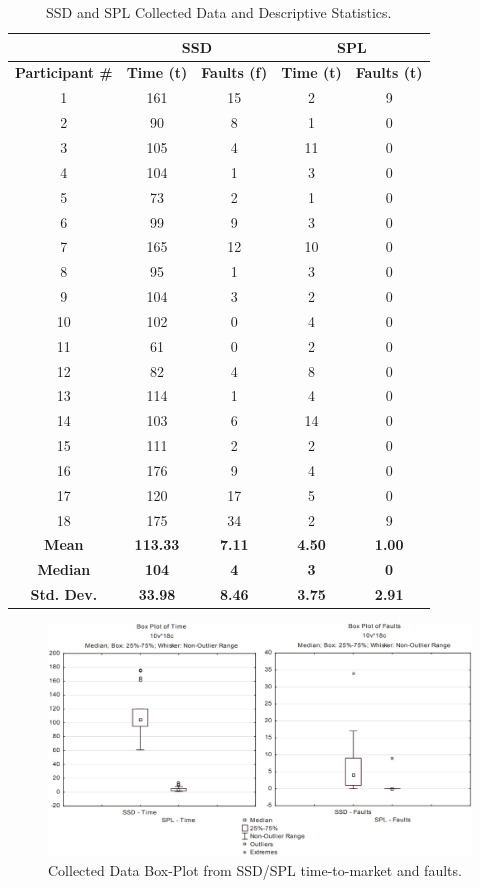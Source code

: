 \begin{table}[!htbp]
\footnotesize
\centering
\caption{SSD and SPL Collected Data and Descriptive Statistics.}
\label{tab:resul1}
\begin{tabular}{|c|c|c|c|c|}
\hline
\textbf{} & \multicolumn{2}{c|}{\textbf{SSD}} & \multicolumn{2}{c|}{\textbf{SPL}} \\ \hline
\textbf{Participant \#} & \textbf{Time (t)} & \textbf{Faults (f)} & \textbf{Time (t)} & \textbf{Faults (t)} \\ \hline
1 & 161 & 15 & 2 & 9 \\ \hline
2 & 90 & 8 & 1 & 0 \\ \hline
3 & 105 & 4 & 11 & 0 \\ \hline
4 & 104 & 1 & 3 & 0 \\ \hline
5 & 73 & 2 & 1 & 0 \\ \hline
6 & 99 & 9 & 3 & 0 \\ \hline
7 & 165 & 12 & 10 & 0 \\ \hline
8 & 95 & 1 & 3 & 0 \\ \hline
9 & 104 & 3 & 2 & 0 \\ \hline
10 & 102 & 0 & 4 & 0 \\ \hline
11 & 61 & 0 & 2 & 0 \\ \hline
12 & 82 & 4 & 8 & 0 \\ \hline
13 & 114 & 1 & 4 & 0 \\ \hline
14 & 103 & 6 & 14 & 0 \\ \hline
15 & 111 & 2 & 2 & 0 \\ \hline
16 & 176 & 9 & 4 & 0 \\ \hline
17 & 120 & 17 & 5 & 0 \\ \hline
18 & 175 & 34 & 2 & 9 \\ \hline
\textbf{Mean} & \textbf{113.33} & \textbf{7.11} & \textbf{4.50} & \textbf{1.00} \\ \hline
\textbf{Median} & \textbf{104} & \textbf{4} & \textbf{3} & \textbf{0} \\ \hline
\textbf{Std. Dev.} & \textbf{33.98} & \textbf{8.46} & \textbf{3.75} & \textbf{2.91} \\ \hline
\end{tabular}
\end{table}

\begin{figure}[!htbp]
\centering
\includegraphics[width=1\textwidth]{MSPLBoxplotN.png}
\centering
\caption{Collected Data Box-Plot from SSD/SPL time-to-market and faults.}
\label{fig:boxplot}
\end{figure}

